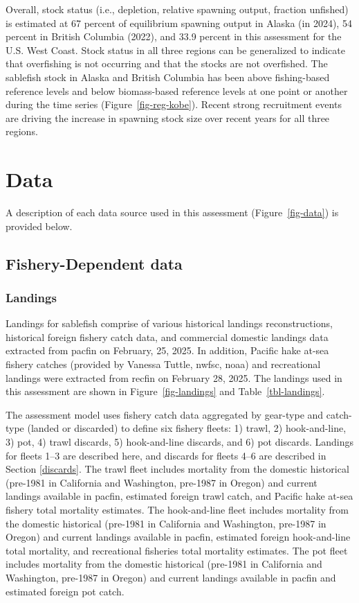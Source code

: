 \documentclass[
  english,
]{article}
\begin{document}
Overall, stock status (i.e., depletion, relative spawning output,
fraction unfished) is estimated at 67 percent of equilibrium spawning
output in Alaska (in 2024), 54 percent in British Columbia (2022), and
33.9 percent in this assessment for the U.S. West Coast. Stock status in
all three regions can be generalized to indicate that overfishing is not
occurring and that the stocks are not overfished. The sablefish stock in
Alaska and British Columbia has been above fishing-based reference
levels and below biomass-based reference levels at one point or another
during the time series (Figure~\ref{fig-reg-kobe}). Recent strong
recruitment events are driving the increase in spawning stock size over
recent years for all three regions.

\newpage{}

\section{Data}\label{data}

A description of each data source used in this assessment
(Figure~\ref{fig-data}) is provided below.

\subsection{Fishery-Dependent data}\label{fishery-dependent-data}

\subsubsection{Landings}\label{landings}

Landings for sablefish comprise of various historical landings
reconstructions, historical foreign fishery catch data, and commercial
domestic landings data extracted from \gls{pacfin} on February, 25,
2025. In addition, Pacific hake at-sea fishery catches (provided by
Vanessa Tuttle, \gls{nwfsc}, \gls{noaa}) and recreational landings were
extracted from \gls{recfin} on February 28, 2025. The landings used in
this assessment are shown in Figure~\ref{fig-landings} and
Table~\ref{tbl-landings}.

The assessment model uses fishery catch data aggregated by gear-type and
catch-type (landed or discarded) to define six fishery fleets: 1) trawl,
2) hook-and-line, 3) pot, 4) trawl discards, 5) hook-and-line discards,
and 6) pot discards. Landings for fleets 1--3 are described here, and
discards for fleets 4--6 are described in Section \ref{discards}. The
trawl fleet includes mortality from the domestic historical (pre-1981 in
California and Washington, pre-1987 in Oregon) and current landings
available in \gls{pacfin}, estimated foreign trawl catch, and Pacific
hake at-sea fishery total mortality estimates. The hook-and-line fleet
includes mortality from the domestic historical (pre-1981 in California
and Washington, pre-1987 in Oregon) and current landings available in
\gls{pacfin}, estimated foreign hook-and-line total mortality, and
recreational fisheries total mortality estimates. The pot fleet includes
mortality from the domestic historical (pre-1981 in California and
Washington, pre-1987 in Oregon) and current landings available in
\gls{pacfin} and estimated foreign pot catch.
\end{document}
